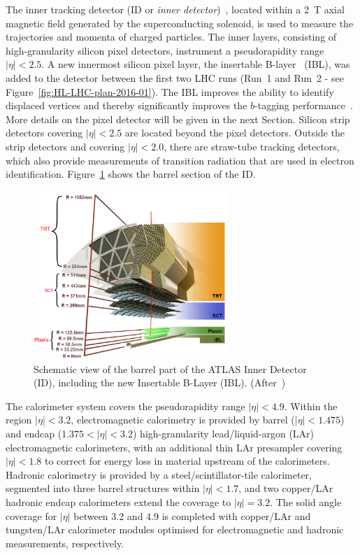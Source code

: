 The inner tracking detector (ID or {\it inner detector})~\cite{ATLASIDTDR}, located within a 2~T axial magnetic field generated by the superconducting solenoid, is used to measure the trajectories and momenta of charged particles. The inner layers, consisting of high-granularity silicon pixel detectors, instrument a pseudorapidity
range $|\eta| < 2.5$.
A new innermost silicon pixel layer, the insertable B-layer~\cite{IBLTDR} (IBL), was added to the detector between the first two LHC runs (Run~1 and Run~2 - see Figure~\ref{fig:HL-LHC-plan-2016-01}). The IBL improves the ability to identify displaced vertices and thereby significantly improves the $b$-tagging performance~\cite{ATL-PHYS-PUB-2015-022}. More details 
on the pixel detector will be given in the next Section.
Silicon strip detectors covering $|\eta| < 2.5$ are located beyond the pixel detectors. 
Outside the strip detectors and covering $|\eta | < 2.0$, there are straw-tube tracking detectors, which also provide measurements of transition radiation that are used in electron identification.
Figure~\ref{fig:ATLASID} shows the barrel section of the ID.

\begin{figure}[!htbp]
\centering
\includegraphics[width=0.65\textwidth]{ATLAS_ID.png}
\caption{\label{fig:ATLASID}Schematic view of the  barrel part of the ATLAS Inner Detector (ID), including the new Insertable B-Layer (IBL). (After~\cite{Potamianos:2016ptf})}
\end{figure}


The calorimeter system covers the pseudorapidity range $|\eta| < 4.9$.
Within the region $|\eta|< 3.2$, electromagnetic calorimetry is provided by barrel ($|\eta| < 1.475$) and
endcap ($1.375 < |\eta| < 3.2$) high-granularity lead/liquid-argon (LAr) electromagnetic calorimeters,
with an additional thin LAr presampler covering $|\eta| < 1.8$ to correct for energy loss in material upstream of the calorimeters.
Hadronic calorimetry is provided by a steel/scintillator-tile calorimeter, segmented into three barrel structures within $|\eta| < 1.7$, and two copper/LAr hadronic endcap calorimeters extend the coverage to $|\eta|=3.2$.
The solid angle coverage for $|\eta|$ between 3.2 and 4.9 is completed with copper/LAr and tungsten/LAr calorimeter modules optimised for electromagnetic and hadronic measurements, respectively.


